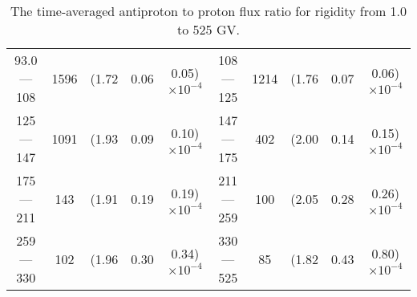 \begin{table}[p]
\begin{tabular}{c|c|ccc  c|c|ccc}
93.0 — 108   &  1596                  &(1.72                                &  0.06                   &      0.05)$\times 10^{-4}$  & 108 — 125    &  1214                   &(1.76                                &  0.07                   &      0.06)$\times 10^{-4}$ \\
125 — 147    &  1091                  &(1.93                                &  0.09                   &      0.10)$\times 10^{-4}$  & 147 — 175    &  402                     &(2.00                                &  0.14                   &      0.15)$\times 10^{-4}$ \\
175 — 211    &  143                    &(1.91                                &  0.19                   &      0.19)$\times 10^{-4}$  & 211 — 259    &  100                     &(2.05                                &  0.28                   &      0.26)$\times 10^{-4}$ \\
259 — 330    &  102                    &(1.96                                &  0.30                   &      0.34)$\times 10^{-4}$  & 330 — 525    &  85                      &(1.82                                &  0.43                   &      0.80)$\times 10^{-4}$ \\
\hline
\end{tabular}
\caption{The time-averaged antiproton to proton flux ratio for rigidity from 1.0 to 525 GV.}
\label{TableOfAveragedResult}
\end{table}


\clearpage



